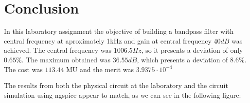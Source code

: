 \section{Conclusion}
\label{sec:conclusion}

In this laboratory assignment the objective of building a bandpass filter with central frequency at aproximately 1kHz and gain at central frequency $40dB$ was achieved. The central frequency was $1006.5 Hz$, so it presents a deviation of only $0.65 \%$.
The maximum obtained was $36.55dB$, which presents a deviation of $8.6 \%$. The cost was $113.44$ MU and the merit was $3.9375\cdot 10^{-4}$
 
The results from both the physical circuit at the laboratory and the circuit
simulation using ngspice appear to match, as we can see in the following figure:



